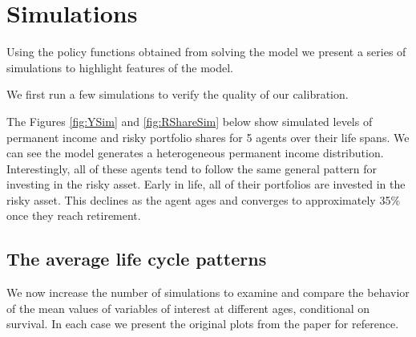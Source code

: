 \documentclass[./CGMPort.tex]{subfiles}
\begin{document}
\providecommand{\figName}{Consumption-Policy-Function} %
\providecommand{\figFile}{Cons_Pol} %
\hypertarget{\figFile}{}
\hypertarget{\figName}{}

\hypertarget{Simulations}{}
\section{Simulations}

Using the policy functions obtained from solving the model we present a series of simulations to highlight features of the model.

We first run a few simulations to verify the quality of our calibration.

The Figures \ref{fig:YSim} and \ref{fig:RShareSim} below show simulated levels of permanent income and risky portfolio shares for 5 agents over their life spans. We can see the model generates a heterogeneous permanent income distribution. Interestingly, all of these agents tend to follow the same general pattern for investing in the risky asset. Early in life, all of their portfolios are invested in the risky asset. This declines as the agent ages and converges to approximately 35\% once they reach retirement.

\providecommand{\figName}{Income-Simulation} %
\providecommand{\figFile}{Y_Sim} %
\hypertarget{\figFile}{}
\hypertarget{\figName}{}

\providecommand{\figName}{Risky-Share-Simulation} %
\providecommand{\figFile}{RShare_Sim} %
\hypertarget{\figFile}{}
\hypertarget{\figName}{}

\subsection{The average life cycle patterns}

We now increase the number of simulations to examine and compare the behavior of the mean values of variables of interest at different ages, conditional on survival. In each case we present the original plots from the paper for reference.
\end{document}
